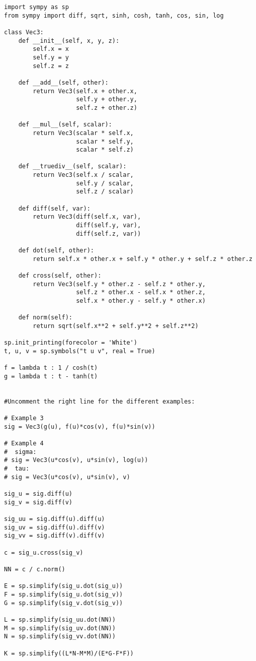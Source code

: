 \documentclass[a4paper,11pt,notitlepage,fullpage]{article}
\begin{document}
\begin{verbatim}
import sympy as sp
from sympy import diff, sqrt, sinh, cosh, tanh, cos, sin, log

class Vec3:
    def __init__(self, x, y, z):
        self.x = x
        self.y = y
        self.z = z
        
    def __add__(self, other):
        return Vec3(self.x + other.x,
                    self.y + other.y,
                    self.z + other.z)
        
    def __mul__(self, scalar):
        return Vec3(scalar * self.x,
                    scalar * self.y,
                    scalar * self.z)
    
    def __truediv__(self, scalar):
        return Vec3(self.x / scalar,
                    self.y / scalar,
                    self.z / scalar)
    
    def diff(self, var):
        return Vec3(diff(self.x, var),
                    diff(self.y, var),
                    diff(self.z, var))
        
    def dot(self, other):
        return self.x * other.x + self.y * other.y + self.z * other.z
    
    def cross(self, other):
        return Vec3(self.y * other.z - self.z * other.y,
                    self.z * other.x - self.x * other.z,
                    self.x * other.y - self.y * other.x)
        
    def norm(self):
        return sqrt(self.x**2 + self.y**2 + self.z**2)

sp.init_printing(forecolor = 'White')
t, u, v = sp.symbols("t u v", real = True)

f = lambda t : 1 / cosh(t)
g = lambda t : t - tanh(t)


#Uncomment the right line for the different examples:

# Example 3
sig = Vec3(g(u), f(u)*cos(v), f(u)*sin(v))

# Example 4
#  sigma:
# sig = Vec3(u*cos(v), u*sin(v), log(u))
#  tau:
# sig = Vec3(u*cos(v), u*sin(v), v)

sig_u = sig.diff(u)
sig_v = sig.diff(v)

sig_uu = sig.diff(u).diff(u)
sig_uv = sig.diff(u).diff(v)
sig_vv = sig.diff(v).diff(v)

c = sig_u.cross(sig_v)

NN = c / c.norm()

E = sp.simplify(sig_u.dot(sig_u))
F = sp.simplify(sig_u.dot(sig_v))
G = sp.simplify(sig_v.dot(sig_v))

L = sp.simplify(sig_uu.dot(NN))
M = sp.simplify(sig_uv.dot(NN))
N = sp.simplify(sig_vv.dot(NN))

K = sp.simplify((L*N-M*M)/(E*G-F*F))
\end{verbatim}
\end{document}
